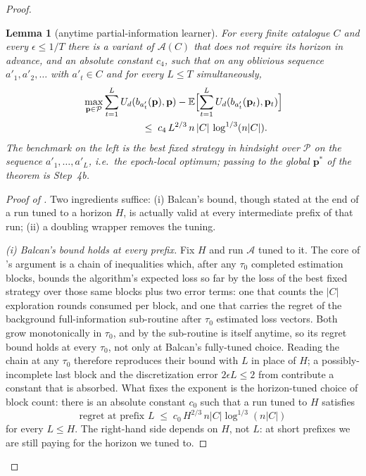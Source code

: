 \documentclass[letterpaper,9pt,twocolumn]{extarticle}
\newcommand{\pvec}{\mathbf{p}}
\newcommand{\cP}{\mathcal{P}}
\newcommand{\EE}{\mathbb{E}}
\theoremstyle{plain}
\newtheorem{lemma}[theorem]{Lemma}
\theoremstyle{definition}
\theoremstyle{remark}
\begin{document}
\begin{proof}
\begin{lemma}[anytime partial-information learner]
\label{lem:anytime}
For every finite catalogue $C$ and every $\epsilon\le 1/T$ there is a
variant of $\mathcal{A}(C)$ that does not require its horizon in
advance, and an absolute constant $c_4$, such that on any oblivious
sequence $a'_1,a'_2,\dots$ with $a'_t\in C$ and for every $L\le T$
simultaneously,
\begin{align}
&\max_{\pvec\in\cP}\sum_{t=1}^{L}U_d(b_{a'_t}(\pvec),\pvec)
 -\EE\Bigl[\sum_{t=1}^{L}U_d(b_{a'_t}(\pvec_t),\pvec_t)\Bigr]\notag\\
&\hspace{6em}\le\;c_4\,L^{2/3}\,n\,|C|\,\log^{1/3}(n|C|).
\label{eq:anytime}
\end{align}
The benchmark on the left is the best fixed strategy in hindsight over
$\cP$ on the sequence $a'_1,\dots,a'_L$, i.e.\ the epoch-local optimum;
passing to the global $\pvec^{*}$ of the theorem is Step~4b.
\end{lemma}

\begin{proof}[Proof of ]
Two ingredients suffice: (i) Balcan's bound, though stated at the end of
a run tuned to a horizon $H$, is actually valid at every intermediate
prefix of that run; (ii) a doubling wrapper removes the tuning.

\emph{(i) Balcan's bound holds at every prefix.}
Fix $H$ and run $\mathcal{A}$ tuned to it. The core of
\citet[Lemma 6.2]{balcan2015}'s argument is a chain of inequalities
which, after any $\tau_0$ completed estimation blocks, bounds the
algorithm's expected loss so far by the loss of the best fixed strategy
over those same blocks plus two error terms: one that counts the
$|C|$ exploration rounds consumed per block, and one that carries the
regret of the background full-information sub-routine after $\tau_0$
estimated loss vectors. Both grow monotonically in $\tau_0$, and by
 the sub-routine is itself anytime, so its regret
bound holds at every $\tau_0$, not only at Balcan's fully-tuned choice.
Reading the chain at any $\tau_0$ therefore reproduces their bound with
$L$ in place of $H$; a possibly-incomplete last block and the
discretization error $2\epsilon L\le 2$ from  contribute a
constant that is absorbed. What fixes the exponent is the horizon-tuned
choice of block count: there is an absolute constant $c_0$ such that a
run tuned to $H$ satisfies
\begin{equation}
\text{regret at prefix }L\;\le\;c_0\,H^{2/3}\,n|C|\log^{1/3}(n|C|)
\label{eq:prefix-bound}
\end{equation}
for every $L\le H$.
The right-hand side depends on $H$, not $L$: at short prefixes we are
still paying for the horizon we tuned to.


\end{proof}
\end{proof}
\end{document}
